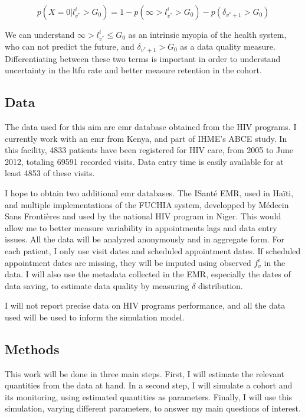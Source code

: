 $$p(X = 0 | l_{v^{*}}^i >  G_0) = 1 - p(\infty > l_{v^{*}}^i >  G_0) - p(\delta_{v^*+1} > G_0) $$

We can understand $\infty > l_{v^{*}}^i \leq  G_0$ as an intrinsic myopia of the health system, who can not predict the future, and $\delta_{v^*+1} > G_0$ as a data quality measure. Differentiating between these two terms is  important in order to understand uncertainty in the \gls{ltfu} rate and better measure retention in the cohort.

\subsection{Data}

The data used for this aim are \gls{emr} database obtained from the HIV programs. I currently work with an \gls{emr} from  Kenya, and part of IHME's ABCE study. In this facility, 4833 patients have been registered for HIV care, from 2005 to June 2012, totaling 69591 recorded visits. Data entry time is easily available for at least 4853 of these visits.

I hope to obtain two additional \gls{emr} databases. The ISanté EMR, used in Haïti, and multiple implementations of the FUCHIA system, developped by Médecin Sans Frontières and used by the national HIV program in Niger. This would allow me to better measure variability in appointments lags and data entry issues. All the data will be analyzed anonymously and in aggregate form. For each patient, I only use visit dates and scheduled appointment dates. If scheduled appointment dates are missing, they will be imputed using observed $f^i_v$ in the data. I will also use the metadata collected in the EMR, especially the dates of data saving, to estimate data quality by measuring $\delta$ distribution.

I will not report precise data on HIV programs performance, and all the data used will be used to inform the simulation model.

\subsection{Methods}

This work will be done in three main steps. First, I will estimate the relevant quantities from the data at hand. In a second step, I will simulate a cohort and its monitoring, using estimated quantities as parameters. Finally, I will use this simulation, varying different parameters, to answer my main questions of interest.

